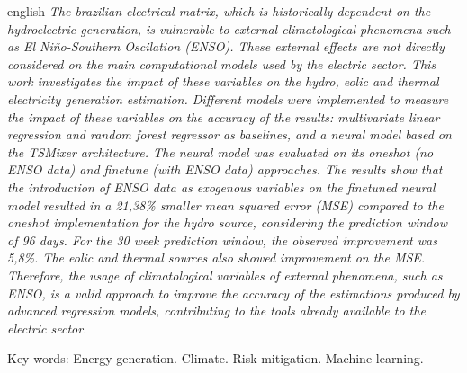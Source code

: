 \begin{resumo}[Abstract]	
\begin{otherlanguage*}{english}
\noindent
\sloppy
\textit{The brazilian electrical matrix, which is historically dependent on the hydroelectric generation, is vulnerable to 
external climatological phenomena such as El Niño-Southern Oscilation (ENSO). These external effects are not directly considered
on the main computational models used by the electric sector. This work investigates the impact of these variables on the
hydro, eolic and thermal electricity generation estimation. Different models were implemented to measure the impact of these variables
on the accuracy of the results: multivariate linear regression and random forest regressor as baselines, and a neural model based on the 
TSMixer architecture. The neural model was evaluated on its oneshot (no ENSO data) and finetune (with ENSO data) approaches.
The results show that the introduction of ENSO data as exogenous variables on the finetuned neural model resulted in a
21,38\% smaller mean squared error (MSE) compared to the oneshot implementation for the hydro source, considering the prediction
window of 96 days. For the 30 week prediction window, the observed improvement was 5,8\%. The eolic and thermal sources
also showed improvement on the MSE. Therefore, the usage of climatological variables of external phenomena, such
as ENSO, is a valid approach to improve the accuracy of the estimations produced by advanced regression models, contributing to the tools already available to the electric sector. }

\vspace{0.2cm}
\noindent
Key-words: Energy generation. Climate. Risk mitigation. Machine learning.
\end{otherlanguage*}
\end{resumo}